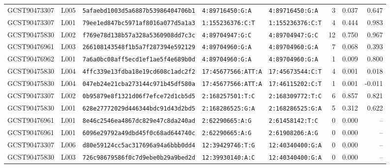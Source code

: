 \documentclass[11pt,a4paper]{article}
\begin{document}
\begin{landscape}
\begin{longtable}{@{}llp{4.2cm}p{2.8cm}p{2.8cm}rrr@{}}
GCST90473307 & L005 &
\texttt{5afaebd1003d5a6887b53986404706b1} &
\texttt{4:89716450:G:A} &
\texttt{4:89716450:G:A} &
3 & 0.037 & 0.647 \\

GCST90473307 & L001 &
\texttt{79ee1ed847bc5971af8016a077d5a1a3} &
\texttt{1:155236376:C:T} &
\texttt{1:155236376:C:T} &
4 & 0.444 & 0.983 \\

GCST90475830 & L002 &
\texttt{f769e78d138b57a328a5360908dd7c3c} &
\texttt{4:89704947:G:C} &
\texttt{4:89704947:G:C} &
12 & 0.750 & 0.967 \\

GCST90476961 & L003 &
\texttt{266108143548f1b5a7f287394e592129} &
\texttt{4:89704960:G:A} &
\texttt{4:89704960:G:A} &
7 & 0.068 & 0.393 \\

GCST90476962 & L001 &
\texttt{7a6a0bc08aff5ecd1ef1ae5f4e689b0d} &
\texttt{4:89704960:G:A} &
\texttt{4:89704960:G:A} &
1 & 0.009 & 0.800 \\

GCST90475830 & L004 &
\texttt{4ffc339e13fdba18e19cd608c1adc2f2} &
\texttt{17:45677566:ATT:A} &
\texttt{17:45673544:C:T} &
4 & 0.001 & 0.018 \\

GCST90475830 & L004 &
\texttt{047eb24e21cba273144c971b45df580a} &
\texttt{17:45677566:ATT:A} &
\texttt{17:46115202:C:T} &
1 & 0.001 & -0.011 \\

GCST90473307 & L002 &
\texttt{0b95879e8f1321d06f7efce72d1cb5d5} &
\texttt{2:168257501:T:C} &
\texttt{2:168309772:T:C} &
6 & 0.857 & 0.821 \\

GCST90475830 & L001 &
\texttt{628e27772029d446344bdc91d43d2bd5} &
\texttt{2:168286525:G:A} &
\texttt{2:168286525:G:A} &
5 & 0.312 & 0.622 \\

GCST90476961 & L001 &
\texttt{8e46c2546ea4867dc829e47c8da240ad} &
\texttt{2:62290665:A:G} &
\texttt{2:61458142:T:C} &
0 & 0.000 & -- \\

GCST90476961 & L001 &
\texttt{6096e29792a49dbd45f0c68ad644740c} &
\texttt{2:62290665:A:G} &
\texttt{2:61908206:A:G} &
0 & 0.000 & -- \\

GCST90473307 & L006 &
\texttt{d80e59124cc5ac317696a94a6bbb0dd4} &
\texttt{12:39429746:T:G} &
\texttt{12:40340400:G:A} &
0 & 0.000 & -- \\

GCST90475830 & L003 &
\texttt{726c98679586f0c7d9ebe0b29a9bed2d} &
\texttt{12:39930140:A:C} &
\texttt{12:40340400:G:A} &
0 & 0.000 & -- \\

\end{longtable}
\endgroup
\end{landscape}
\end{document}
